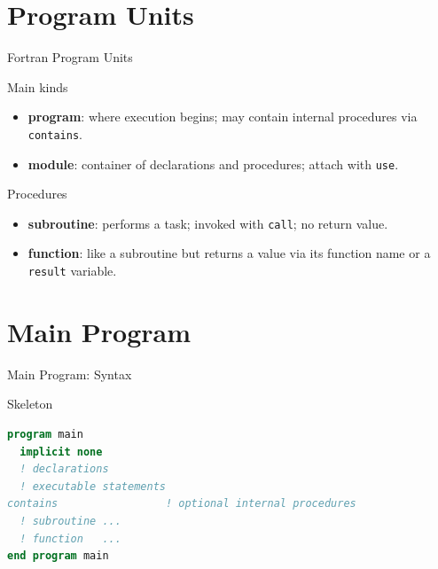 
\subtitle{Lecture 4: programs, modules, subroutines, and functions}



\begin{frame}
  \titlepage
\end{frame}

\section{Program Units}

\begin{frame}{Fortran Program Units}
  \begin{block}{Main kinds}
    \begin{itemize}
      \item \textbf{program}: where execution begins; may contain internal procedures via \texttt{contains}.
      \item \textbf{module}: container of declarations and procedures; attach with \texttt{use}.
    \end{itemize}
  \end{block}
  \begin{block}{Procedures}
    \begin{itemize}
      \item \textbf{subroutine}: performs a task; invoked with \texttt{call}; no return value.
      \item \textbf{function}: like a subroutine but returns a value via its function name or a \texttt{result} variable.
    \end{itemize}
  \end{block}
\end{frame}

\section{Main Program}

\begin{frame}[fragile]{Main Program: Syntax}
\begin{block}{Skeleton}
\begin{lstlisting}[language=Fortran]
program main
  implicit none
  ! declarations
  ! executable statements
contains                 ! optional internal procedures
  ! subroutine ...
  ! function   ...
end program main
\end{lstlisting}
\end{block}
\end{frame}

